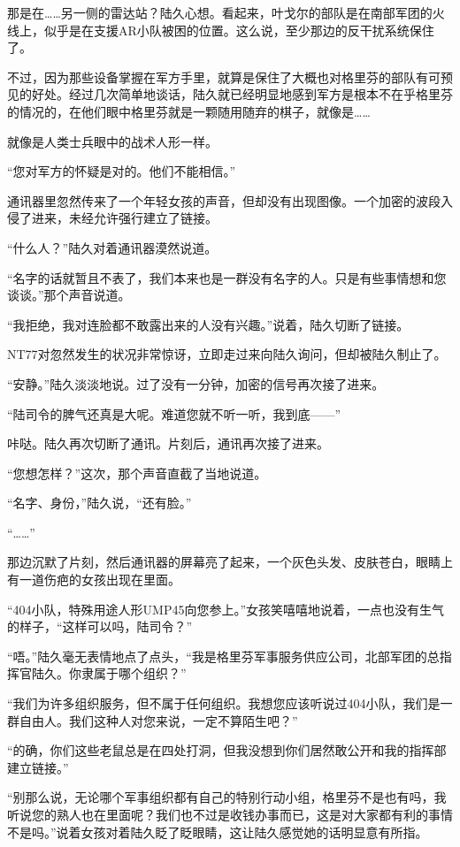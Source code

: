 那是在……另一侧的雷达站？陆久心想。看起来，叶戈尔的部队是在南部军团的火线上，似乎是在支援AR小队被困的位置。这么说，至少那边的反干扰系统保住了。

不过，因为那些设备掌握在军方手里，就算是保住了大概也对格里芬的部队有可预见的好处。经过几次简单地谈话，陆久就已经明显地感到军方是根本不在乎格里芬的情况的，在他们眼中格里芬就是一颗随用随弃的棋子，就像是……

就像是人类士兵眼中的战术人形一样。

“您对军方的怀疑是对的。他们不能相信。”

通讯器里忽然传来了一个年轻女孩的声音，但却没有出现图像。一个加密的波段入侵了进来，未经允许强行建立了链接。

“什么人？”陆久对着通讯器漠然说道。

“名字的话就暂且不表了，我们本来也是一群没有名字的人。只是有些事情想和您谈谈。”那个声音说道。

“我拒绝，我对连脸都不敢露出来的人没有兴趣。”说着，陆久切断了链接。

NT77对忽然发生的状况非常惊讶，立即走过来向陆久询问，但却被陆久制止了。

“安静。”陆久淡淡地说。过了没有一分钟，加密的信号再次接了进来。

“陆司令的脾气还真是大呢。难道您就不听一听，我到底——”

咔哒。陆久再次切断了通讯。片刻后，通讯再次接了进来。

“您想怎样？”这次，那个声音直截了当地说道。

“名字、身份，”陆久说，“还有脸。”

“……”

那边沉默了片刻，然后通讯器的屏幕亮了起来，一个灰色头发、皮肤苍白，眼睛上有一道伤疤的女孩出现在里面。

“404小队，特殊用途人形UMP45向您参上。”女孩笑嘻嘻地说着，一点也没有生气的样子，“这样可以吗，陆司令？”

“唔。”陆久毫无表情地点了点头，“我是格里芬军事服务供应公司，北部军团的总指挥官陆久。你隶属于哪个组织？”

“我们为许多组织服务，但不属于任何组织。我想您应该听说过404小队，我们是一群自由人。我们这种人对您来说，一定不算陌生吧？”

“的确，你们这些老鼠总是在四处打洞，但我没想到你们居然敢公开和我的指挥部建立链接。”

“别那么说，无论哪个军事组织都有自己的特别行动小组，格里芬不是也有吗，我听说您的熟人也在里面呢？我们也不过是收钱办事而已，这是对大家都有利的事情不是吗。”说着女孩对着陆久眨了眨眼睛，这让陆久感觉她的话明显意有所指。

